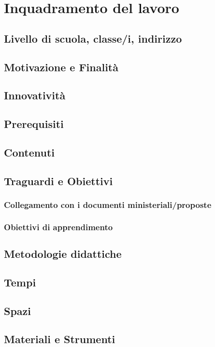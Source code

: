 \documentclass[../../relazione.tex]{subfiles}
\begin{document}
\section{Inquadramento del lavoro}

\subsection{Livello di scuola, classe/i, indirizzo}

\subsection{Motivazione e Finalità}

\subsection{Innovatività}

\subsection{Prerequisiti}

\subsection{Contenuti}

\subsection{Traguardi e Obiettivi}

\subsubsection{Collegamento con i documenti ministeriali/proposte}

\subsubsection{Obiettivi di apprendimento}

\subsection{Metodologie didattiche}

\subsection{Tempi}

\subsection{Spazi}

\subsection{Materiali e Strumenti}
\end{document}
